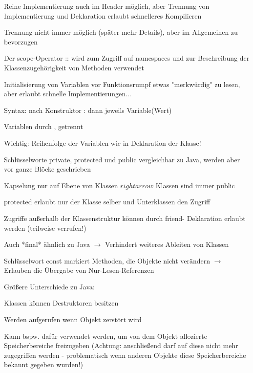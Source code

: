 \documentclass[10pt]{article}
\begin{document}
\begin{itemize*}
  \item Reine Implementierung auch im Header möglich, aber Trennung von Implementierung und Deklaration erlaubt schnelleres Kompilieren
  \item Trennung nicht immer möglich (später mehr Details), aber im Allgemeinen zu bevorzugen
  \item Der scope-Operator :: wird zum Zugriff auf namespaces und zur Beschreibung der Klassenzugehörigkeit von Methoden verwendet
  \item Initialisierung von Variablen vor Funktionsrumpf etwas "merkwürdig" zu lesen, aber erlaubt schnelle Implementierungen...
  \begin{itemize*}
    \item Syntax: nach Konstruktor : dann jeweils Variable(Wert)
    \item Variablen durch , getrennt
    \item Wichtig: Reihenfolge der Variablen wie in Deklaration der Klasse!
  \end{itemize*}
  \item Schlüsselworte private, protected und public vergleichbar zu Java, werden aber vor ganze Blöcke geschrieben
  \begin{itemize*}
    \item Kapselung nur auf Ebene von Klassen $rightarrow$ Klassen sind immer public
    \item protected erlaubt nur der Klasse selber und Unterklassen den Zugriff
  \end{itemize*}
  \item Zugriffe außerhalb der Klassenstruktur können durch friend- Deklaration erlaubt werden (teilweise verrufen!)
  \item Auch *final* ähnlich zu Java $\rightarrow$ Verhindert weiteres Ableiten von Klassen
  \item Schlüsselwort const markiert Methoden, die Objekte nicht verändern $\rightarrow$ Erlauben die Übergabe von Nur-Lesen-Referenzen
  \item Größere Unterschiede zu Java:
  \begin{itemize*}
    \item Klassen können Destruktoren besitzen
    \begin{itemize*}
      \item Werden aufgerufen wenn Objekt zerstört wird
      \item Kann bspw. dafür verwendet werden, um von dem Objekt allozierte Speicherbereiche freizugeben (Achtung: anschließend darf auf diese nicht mehr zugegriffen werden - problematisch wenn anderen Objekte diese Speicherbereiche bekannt gegeben wurden!)

\end{itemize*}
\end{itemize*}
\end{itemize*}
\end{document}
